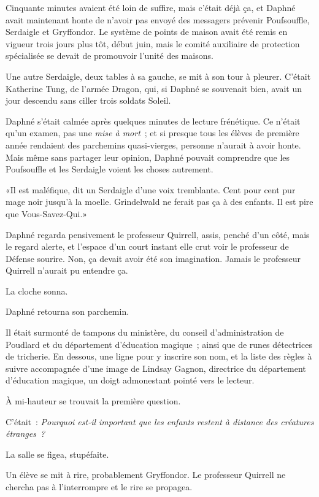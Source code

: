 Cinquante minutes avaient été loin de suffire, mais c'était déjà ça, et Daphné avait maintenant honte de n'avoir pas envoyé des messagers prévenir Poufsouffle, Serdaigle et Gryffondor. Le système de points de maison avait été remis en vigueur trois jours plus tôt, début juin, mais le comité auxiliaire de protection spécialisée se devait de promouvoir l'unité des maisons.

Une autre Serdaigle, deux tables à sa gauche, se mit à son tour à pleurer. C'était Katherine Tung, de l'armée Dragon, qui, si Daphné se souvenait bien, avait un jour descendu sans ciller trois soldats Soleil.

Daphné s'était calmée après quelques minutes de lecture frénétique. Ce n'était qu'un examen, pas une \emph{mise à mort}~; et si presque tous les élèves de première année rendaient des parchemins quasi-vierges, personne n'aurait à avoir honte. Mais même sans partager leur opinion, Daphné pouvait comprendre que les Poufsouffle et les Serdaigle voient les choses autrement.

«Il est maléfique, dit un Serdaigle d'une voix tremblante. Cent pour cent pur mage noir jusqu'à la moelle. Grindelwald ne ferait pas ça à des enfants. Il est pire que Vous-Savez-Qui.»

Daphné regarda pensivement le professeur Quirrell, assis, penché d'un côté, mais le regard alerte, et l'espace d'un court instant elle crut voir le professeur de Défense sourire. Non, ça devait avoir été son imagination. Jamais le professeur Quirrell n'aurait pu entendre ça.

La cloche sonna.

Daphné retourna son parchemin.

Il était surmonté de tampons du ministère, du conseil d'administration de Poudlard et du département d'éducation magique~; ainsi que de runes détectrices de tricherie. En dessous, une ligne pour y inscrire son nom, et la liste des règles à suivre accompagnée d'une image de Lindsay Gagnon, directrice du département d'éducation magique, un doigt admonestant pointé vers le lecteur.

À mi-hauteur se trouvait la première question.

C'était~: \emph{Pourquoi est-il important que les enfants restent à distance des créatures étranges~?}

La salle se figea, stupéfaite.

Un élève se mit à rire, probablement Gryffondor. Le professeur Quirrell ne chercha pas à l'interrompre et le rire se propagea.

